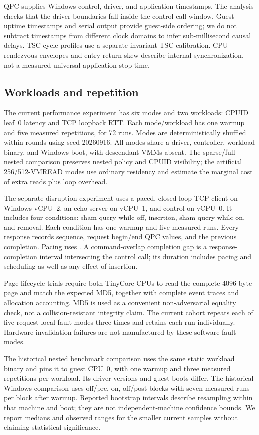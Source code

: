 QPC supplies Windows control, driver, and application timestamps. The analysis
checks that the driver boundaries fall inside the control-call window. Guest
uptime timestamps and serial output provide guest-side ordering; we do not
subtract timestamps from different clock domains to infer sub-millisecond
causal delays. TSC-cycle profiles use a separate invariant-TSC calibration.
CPU rendezvous envelopes and entry-return skew describe internal synchronization,
not a measured universal application stop time.

\subsection{Workloads and repetition}
The current performance experiment has six modes and two workloads: CPUID
leaf~0 latency and TCP loopback RTT. Each mode/workload has one warmup and five
measured repetitions, for 72 runs. Modes are deterministically shuffled within
rounds using seed 20260916. All modes share a driver, controller, workload binary,
and Windows boot, with descendant VMMs absent. The sparse/full nested comparison
preserves nested policy and CPUID visibility; the artificial 256/512-VMREAD modes
use ordinary residency and estimate the marginal cost of extra reads plus loop
overhead.

The separate disruption experiment uses a paced, closed-loop TCP client on
Windows vCPU~2, an echo server on vCPU~1, and control on vCPU~0. It includes four
conditions: sham query while off, insertion, sham query while on, and removal.
Each condition has one warmup and five measured runs. Every response records
sequence, request begin/end QPC values, and the previous completion. Pacing uses
. A command-overlap completion gap is a response-completion interval
intersecting the control call; its duration includes pacing and scheduling as
well as any effect of insertion.

Page lifecycle trials require both TinyCore CPUs to read the complete 4096-byte
page and match the expected MD5, together with complete event traces and
allocation accounting. MD5 is used as a convenient non-adversarial equality
check, not a collision-resistant integrity claim. The current cohort repeats
each of five request-local fault modes three times and retains each run
individually. Hardware invalidation failures are not manufactured by these
software fault modes.

The historical nested benchmark comparison uses the same static workload binary
and pins it to guest CPU~0, with one warmup and three measured repetitions per
workload. Its driver versions and guest boots differ. The historical Windows
comparison uses off/pre, on, off/post blocks with seven measured runs per block
after warmup. Reported bootstrap intervals describe resampling within that
machine and boot; they are not independent-machine confidence bounds. We report
medians and observed ranges for the smaller current samples without claiming
statistical significance.


